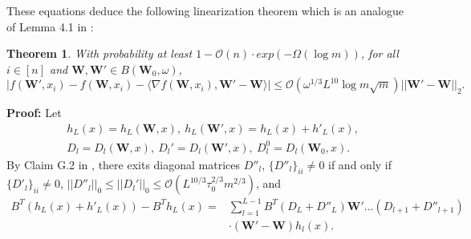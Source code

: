 \documentclass{article}
\newcommand{\cO}{\mathcal{O}}
\newtheorem{theo}{\textbf{Theorem}}
\begin{document}
These equations deduce the following linearization theorem which is an analogue of Lemma 4.1 in \cite{cao}:
\begin{theo}\label{lf}
With probability at least $1-\cO(n)\cdot exp(-\Omega(\log m))$, for all $i\in [n]$ and $\bm{W},\bm{W}'\in B(\bm{W}_0,\omega)$,
\begin{equation}
|f(\bm{W}',x_i)-f(\bm{W},x_i)-\langle \nabla f(\bm{W},x_i), \bm{W}'-\bm{W}\rangle |\leq \cO(\omega^{1/3}L^{10}\log m \sqrt{m})||\bm{W}'-\bm{W}||_2.
\end{equation}
\end{theo}
{\bf Proof:}
Let
\begin{equation}
\begin{aligned}
&h_L(x)=h_L(\bm{W},x),\  h_L(\bm{W'},x)=h_L(x)+h'_L(x),\\
&D_l=D_l(\bm{W},x),\ D_l'=D_l(\bm{W}',x), \ D^0_l=D_l(\bm{W}_0,x).
\end{aligned}
\end{equation}
By Claim G.2 in \cite{rate}, there exits diagonal matrices $D''_l$, $\{D''_l\}_{ii}\neq 0$ if and only if $ \{D'_l\}_{ii}\neq 0$, $||D''_l||_0\leq ||D_l'||_0\leq \cO(L^{10/3}\tau_0^{2/3}m^{2/3})$, and
\begin{equation}
\begin{aligned}
B^T(h_L(x)+h'_L(x))-B^Th_L(x)=&\sum_{l=1}^{L-1}B^T(D_L+D''_L)\bm{W}'...(D_{l+1}+D''_{l+1})\\
&\cdot (\bm{W}'-\bm{W})h_l(x).
\end{aligned}
\end{equation}
\end{document}
